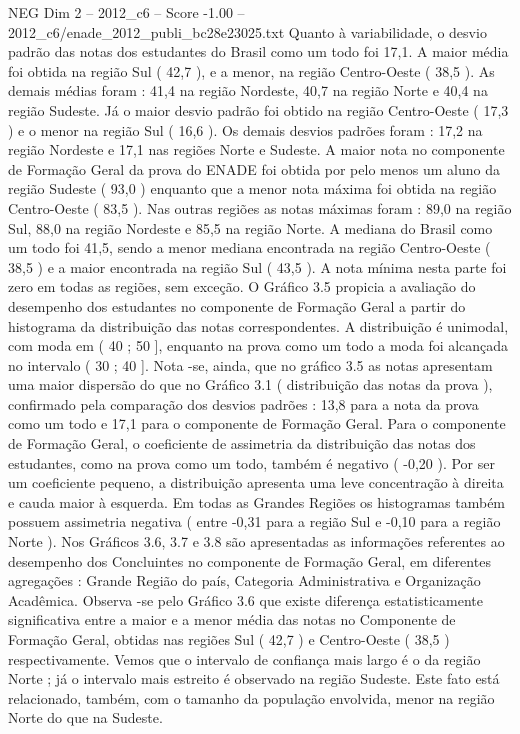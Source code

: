 \begin{textsample}{NEG Dim 2 – 2012\_c6 – Score -1.00 – 2012\_c6/enade\_2012\_publi\_bc28e23025.txt}
Quanto à variabilidade, o desvio padrão das notas dos estudantes do Brasil como um todo foi 17,1.
A maior média foi obtida na região Sul ( 42,7 ), e a menor, na região Centro-Oeste ( 38,5 ).
As demais médias foram : 41,4 na região Nordeste, 40,7 na região Norte e 40,4 na região Sudeste.
Já o maior desvio padrão foi obtido na região Centro-Oeste ( 17,3 ) e o menor na região Sul ( 16,6 ).
Os demais desvios padrões foram : 17,2 na região Nordeste e 17,1 nas regiões Norte e Sudeste.
A maior nota no componente de Formação Geral da prova do ENADE foi obtida por pelo menos um aluno da região Sudeste ( 93,0 ) enquanto que a menor nota máxima foi obtida na região Centro-Oeste ( 83,5 ).
Nas outras regiões as notas máximas foram : 89,0 na região Sul, 88,0 na região Nordeste e 85,5 na região Norte.
A mediana do Brasil como um todo foi 41,5, sendo a menor mediana encontrada na região Centro-Oeste ( 38,5 ) e a maior encontrada na região Sul ( 43,5 ).
A nota mínima nesta parte foi zero em todas as regiões, sem exceção.
O Gráfico 3.5 propicia a avaliação do desempenho dos estudantes no componente de Formação Geral a partir do histograma da distribuição das notas correspondentes.
A distribuição é unimodal, com moda em ( 40 ; 50 ], enquanto na prova como um todo a moda foi alcançada no intervalo ( 30 ; 40 ].
Nota -se, ainda, que no gráfico 3.5 as notas apresentam uma maior dispersão do que no Gráfico 3.1 ( distribuição das notas da prova ), confirmado pela comparação dos desvios padrões : 13,8 para a nota da prova como um todo e 17,1 para o componente de Formação Geral.
Para o componente de Formação Geral, o coeficiente de assimetria da distribuição das notas dos estudantes, como na prova como um todo, também é negativo ( -0,20 ).
Por ser um coeficiente pequeno, a distribuição apresenta uma leve concentração à direita e cauda maior à esquerda.
Em todas as Grandes Regiões os histogramas também possuem assimetria negativa ( entre -0,31 para a região Sul e -0,10 para a região Norte ).
Nos Gráficos 3.6, 3.7 e 3.8 são apresentadas as informações referentes ao desempenho dos Concluintes no componente de Formação Geral, em diferentes agregações : Grande Região do país, Categoria Administrativa e Organização Acadêmica.
Observa -se pelo Gráfico 3.6 que existe diferença estatisticamente significativa entre a maior e a menor média das notas no Componente de Formação Geral, obtidas nas regiões Sul ( 42,7 ) e Centro-Oeste ( 38,5 ) respectivamente.
Vemos que o intervalo de confiança mais largo é o da região Norte ; já o intervalo mais estreito é observado na região Sudeste.
Este fato está relacionado, também, com o tamanho da população envolvida, menor na região Norte do que na Sudeste.

\end{textsample}
